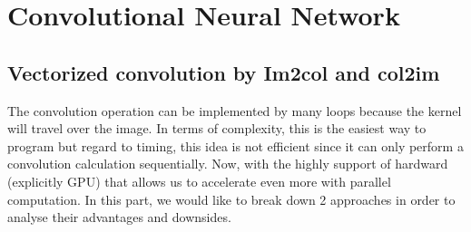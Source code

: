 \section{Convolutional Neural Network}
\subsection{Vectorized convolution by Im2col and col2im}
The convolution operation can be implemented by many loops because the kernel will travel over the image. In terms of complexity, this is the easiest way to program but regard to timing, this idea is not efficient since it can only perform a convolution calculation sequentially. Now, with the highly support of hardward (explicitly GPU) that allows us to accelerate even more with parallel computation. In this part, we would like to break down 2 approaches in order to analyse their advantages and downsides.

